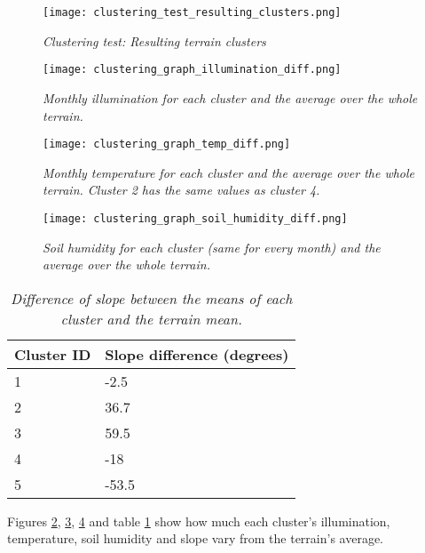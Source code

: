 \begin{figure}
\center
	\texttt{[image: clustering\_test\_resulting\_clusters.png]}
	\caption{ \textit{Clustering test: Resulting terrain clusters}}	
	\label{fig:clustering_test_resulting_clusters}
\end{figure}

\begin{figure}
\center
	\texttt{[image: clustering\_graph\_illumination\_diff.png]}
	\caption{ \textit{Monthly illumination for each cluster and the average over the whole terrain.}}	
	\label{fig:clustering_graph_illumination}
\end{figure}

\begin{figure}
\center
	\texttt{[image: clustering\_graph\_temp\_diff.png]}
	\caption{ \textit{Monthly temperature for each cluster and the average over the whole terrain. Cluster 2 has the same values as cluster 4.}}	
	\label{fig:clustering_graph_temp}
\end{figure}

\begin{figure}
\center
	\texttt{[image: clustering\_graph\_soil\_humidity\_diff.png]}
	\caption{ \textit{Soil humidity for each cluster (same for every month) and the average over the whole terrain.}}	
	\label{fig:clustering_graph_humidity}
\end{figure}

\begin{table}[]
  \centering
	\begin{tabular}{|p{5cm}|p{5cm}|}
	\hline
	\textbf{Cluster ID} & \textbf{Slope difference (degrees)}\\
	\hline
	1 & -2.5 \\	
	\hline
	2 & 36.7\\	
	\hline
	3 & 59.5\\	
	\hline
	4 & -18\\	
	\hline
	5 & -53.5\\		
	\hline
	\end{tabular}
	\caption{ \textit{Difference of slope between the means of each cluster and the terrain mean.}}
	\label{tab:clustering_slope_mean}
\end{table}

Figures \ref{fig:clustering_graph_illumination}, \ref{fig:clustering_graph_temp}, \ref{fig:clustering_graph_humidity} and table \ref{tab:clustering_slope_mean} show how much each cluster's illumination, temperature, soil humidity and slope vary from the terrain's average.\\ 

